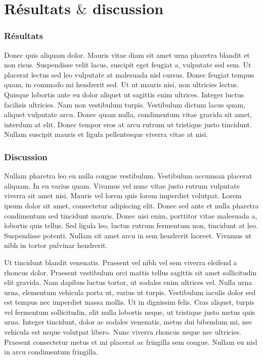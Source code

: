 \chapter{Résultats $\&$  discussion}
\minitoc

\subsection{Résultats}

Donec quis aliquam dolor. Mauris vitae diam sit amet urna pharetra blandit et non risus. Suspendisse velit lacus, suscipit eget feugiat a, vulputate sed sem. Ut placerat lectus sed leo vulputate at malesuada nisl cursus. Donec feugiat tempus quam, in commodo mi hendrerit sed. Ut ut mauris nisi, non ultricies lectus. Quisque lobortis ante eu dolor aliquet ut sagittis enim ultrices. Integer luctus facilisis ultricies. Nam non vestibulum turpis. Vestibulum dictum lacus quam, aliquet vulputate arcu. Donec quam nulla, condimentum vitae gravida sit amet, interdum at elit. Donec tempor eros at arcu rutrum ut tristique justo tincidunt. Nullam suscipit mauris et ligula pellentesque viverra vitae at nisi. 

\subsection{Discussion}

Nullam pharetra leo eu nulla congue vestibulum. Vestibulum accumsan placerat aliquam. In eu varius quam. Vivamus vel nunc vitae justo rutrum vulputate viverra sit amet nisi. Mauris vel lorem quis lorem imperdiet volutpat. Lorem ipsum dolor sit amet, consectetur adipiscing elit. Donec sed ante et nulla pharetra condimentum sed tincidunt mauris. Donec nisi enim, porttitor vitae malesuada a, lobortis quis tellus. Sed ligula leo, luctus rutrum fermentum non, tincidunt at leo. Suspendisse potenti. Nullam sit amet arcu in sem hendrerit laoreet. Vivamus ut nibh in tortor pulvinar hendrerit. 

Ut tincidunt blandit venenatis. Praesent vel nibh vel sem viverra eleifend a rhoncus dolor. Praesent vestibulum orci mattis tellus sagittis sit amet sollicitudin elit gravida. Nam dapibus luctus tortor, ut sodales enim ultrices vel. Nulla urna urna, elementum vehicula porta ut, varius ut turpis. Vestibulum iaculis dolor sed est tempus nec imperdiet massa mollis. Ut in dignissim felis. Cras aliquet, turpis vel fermentum sollicitudin, elit nulla lobortis neque, ut tristique justo metus quis urna. Integer tincidunt, dolor ac sodales venenatis, metus dui bibendum mi, nec vehicula est neque volutpat libero. Nunc viverra rhoncus neque nec ultricies. Praesent consectetur metus et mi placerat ac fringilla sem congue. Nullam eu nisl in arcu condimentum fringilla. 
